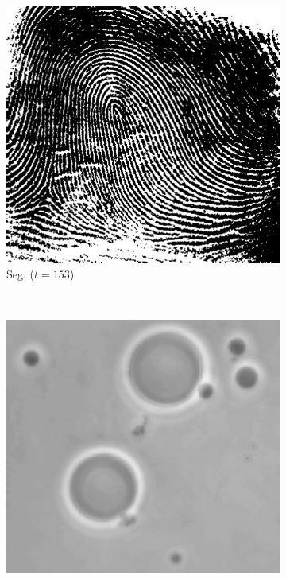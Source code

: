 \documentclass[]{article}
\begin{document}
\begin{figure}[H]
\begin{subfigure}{0.25\textwidth}
        \includegraphics[width=\textwidth]{img/thumbprint-segmented}
        \caption{Seg. ($t=153$)}
    \end{subfigure}%
    ~
    \begin{subfigure}{0.25\textwidth}
        \centering
        \includegraphics[width=\textwidth]{img/before/polymercell}

\end{subfigure}
\end{figure}
\end{document}
